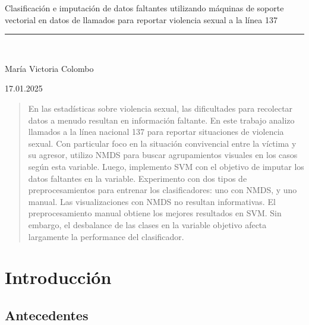 \documentclass[10 pt]{article}
\begin{document}
\begin{titlepage}
\begin{center}
\begin{large}
    \vspace*{0.15in}
    Clasificación e imputación de datos faltantes utilizando máquinas de soporte vectorial en datos de llamados para reportar violencia sexual a la línea 137 \\
    
    
    \end{large}
    \vspace*{0.2in}
    \vspace*{0.3in}
    
    
    \vspace*{0.3in}
    \rule{80mm}{0.1mm}\\
    \vspace*{0.1in}
    \begin{large}
    María Victoria Colombo
    
    \vspace*{0.3in}
    
    \vspace*{0.1in}17.01.2025
    \end{large}
    \end{center}
    
    \end{titlepage}

\newpage

\begin{abstract}
    En las estadísticas sobre violencia sexual, las dificultades para recolectar datos a menudo resultan en información faltante. En este trabajo analizo llamados a la línea nacional 137 para reportar situaciones de violencia sexual. Con particular foco en la situación convivencial entre la víctima y su agresor, utilizo NMDS para buscar agrupamientos visuales en los casos según esta variable. Luego, implemento SVM con el objetivo de imputar los datos faltantes en la variable. Experimento con dos tipos de preprocesamientos para entrenar los clasificadores: uno con NMDS, y uno manual. Las visualizaciones con NMDS no resultan informativas. El preprocesamiento manual obtiene los mejores resultados en SVM. Sin embargo, el desbalance de las clases en la variable objetivo afecta largamente la performance del clasificador.  
\end{abstract}
\newpage
\tableofcontents
\newpage

\section{Introducción}\label{intro}

\subsection{Antecedentes}
\end{document}
